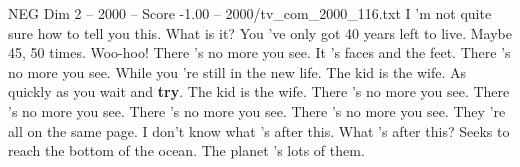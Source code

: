 \begin{textsample}{NEG Dim 2 – 2000 – Score -1.00 – 2000/tv\_com\_2000\_116.txt}  \label{ex:f2_neg_009}
I 'm not quite sure how to tell you this.
What is it?
You 've only got 40 years left to live.
Maybe 45, 50 times.
Woo-hoo!
There 's no more you see.
It 's faces and the feet.
There 's no more you see.
While you 're still in the new life.
The kid is the wife.
As quickly as you wait and \textbf{try}.
The kid is the wife.
There 's no more you see.
There 's no more you see.
There 's no more you see.
There 's no more you see.
They 're all on the same page.
I don't know what 's after this.
What 's after this?
Seeks to reach the bottom of the ocean.
The planet 's lots of them.

\end{textsample}

